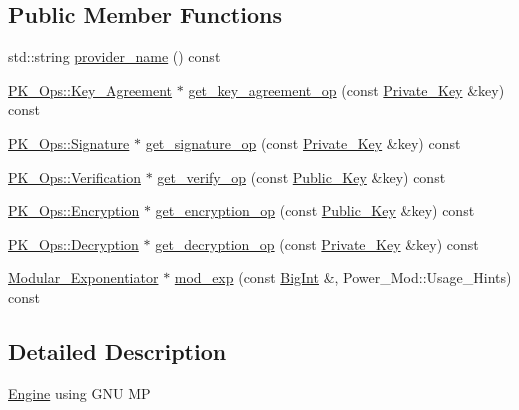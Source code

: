 \subsection*{Public Member Functions}
\begin{DoxyCompactItemize}
\item 
std\-::string \hyperlink{classBotan_1_1GMP__Engine_abc529340c4946c240731f149a86f736c}{provider\-\_\-name} () const 
\item 
\hyperlink{classBotan_1_1PK__Ops_1_1Key__Agreement}{P\-K\-\_\-\-Ops\-::\-Key\-\_\-\-Agreement} $\ast$ \hyperlink{classBotan_1_1GMP__Engine_ac8fb1b99628c4ce58389daaf30b80840}{get\-\_\-key\-\_\-agreement\-\_\-op} (const \hyperlink{classBotan_1_1Private__Key}{Private\-\_\-\-Key} \&key) const 
\item 
\hyperlink{classBotan_1_1PK__Ops_1_1Signature}{P\-K\-\_\-\-Ops\-::\-Signature} $\ast$ \hyperlink{classBotan_1_1GMP__Engine_afba91185fdbda2d444561d35af0955c4}{get\-\_\-signature\-\_\-op} (const \hyperlink{classBotan_1_1Private__Key}{Private\-\_\-\-Key} \&key) const 
\item 
\hyperlink{classBotan_1_1PK__Ops_1_1Verification}{P\-K\-\_\-\-Ops\-::\-Verification} $\ast$ \hyperlink{classBotan_1_1GMP__Engine_aa8196b1a86ac5be2c823ef09010b9174}{get\-\_\-verify\-\_\-op} (const \hyperlink{classBotan_1_1Public__Key}{Public\-\_\-\-Key} \&key) const 
\item 
\hyperlink{classBotan_1_1PK__Ops_1_1Encryption}{P\-K\-\_\-\-Ops\-::\-Encryption} $\ast$ \hyperlink{classBotan_1_1GMP__Engine_a5f1074ae73b04b7de50ec9b8980baab8}{get\-\_\-encryption\-\_\-op} (const \hyperlink{classBotan_1_1Public__Key}{Public\-\_\-\-Key} \&key) const 
\item 
\hyperlink{classBotan_1_1PK__Ops_1_1Decryption}{P\-K\-\_\-\-Ops\-::\-Decryption} $\ast$ \hyperlink{classBotan_1_1GMP__Engine_ad36aefbaa831f85168cdb70a40abc11f}{get\-\_\-decryption\-\_\-op} (const \hyperlink{classBotan_1_1Private__Key}{Private\-\_\-\-Key} \&key) const 
\item 
\hyperlink{classBotan_1_1Modular__Exponentiator}{Modular\-\_\-\-Exponentiator} $\ast$ \hyperlink{classBotan_1_1GMP__Engine_a1e281597e9c88751a296b367436c180d}{mod\-\_\-exp} (const \hyperlink{classBotan_1_1BigInt}{Big\-Int} \&, Power\-\_\-\-Mod\-::\-Usage\-\_\-\-Hints) const 
\end{DoxyCompactItemize}


\subsection{Detailed Description}
\hyperlink{classBotan_1_1Engine}{Engine} using G\-N\-U M\-P 

